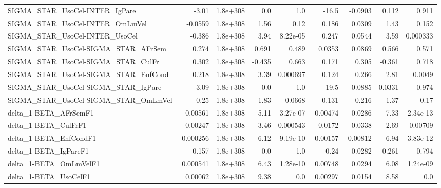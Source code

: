 \begin{tabular}{lrrrrrrrr}
SIGMA\_STAR\_UsoCel-INTER\_IgPare        &       -3.01 &     1.8e+308 &     0.0 &      1.0 &      -16.5 &     -0.0903 &        0.112 &         0.911 \\
SIGMA\_STAR\_UsoCel-INTER\_OmLmVel       &     -0.0559 &     1.8e+308 &    1.56 &     0.12 &      0.186 &      0.0309 &         1.43 &         0.152 \\
SIGMA\_STAR\_UsoCel-INTER\_UsoCel        &      -0.386 &     1.8e+308 &    3.94 & 8.22e-05 &      0.247 &      0.0544 &         3.59 &      0.000333 \\
SIGMA\_STAR\_UsoCel-SIGMA\_STAR\_AFrSem   &       0.274 &     1.8e+308 &   0.691 &    0.489 &     0.0353 &      0.0869 &        0.566 &         0.571 \\
SIGMA\_STAR\_UsoCel-SIGMA\_STAR\_CulFr    &       0.302 &     1.8e+308 &  -0.435 &    0.663 &      0.171 &       0.305 &       -0.361 &         0.718 \\
SIGMA\_STAR\_UsoCel-SIGMA\_STAR\_EnfCond  &       0.218 &     1.8e+308 &    3.39 & 0.000697 &      0.124 &       0.266 &         2.81 &        0.0049 \\
SIGMA\_STAR\_UsoCel-SIGMA\_STAR\_IgPare   &        3.09 &     1.8e+308 &     0.0 &      1.0 &       19.5 &      0.0885 &       0.0331 &         0.974 \\
SIGMA\_STAR\_UsoCel-SIGMA\_STAR\_OmLmVel  &        0.25 &     1.8e+308 &    1.83 &   0.0668 &      0.131 &       0.216 &         1.37 &          0.17 \\
delta\_1-BETA\_AFrSemF1                 &     0.00561 &     1.8e+308 &    5.11 & 3.27e-07 &    0.00474 &      0.0286 &         7.33 &      2.34e-13 \\
delta\_1-BETA\_CulFrF1                  &     0.00247 &     1.8e+308 &    3.46 & 0.000543 &    -0.0172 &     -0.0338 &         2.69 &       0.00709 \\
delta\_1-BETA\_EnfCondF1                &   -0.000256 &     1.8e+308 &    6.12 & 9.19e-10 &   -0.00157 &    -0.00812 &         6.94 &      3.83e-12 \\
delta\_1-BETA\_IgPareF1                 &      -0.157 &     1.8e+308 &     0.0 &      1.0 &      -0.24 &     -0.0282 &        0.261 &         0.794 \\
delta\_1-BETA\_OmLmVelF1                &    0.000541 &     1.8e+308 &    6.43 & 1.28e-10 &    0.00748 &      0.0294 &         6.08 &      1.24e-09 \\
delta\_1-BETA\_UsoCelF1                 &     0.00062 &     1.8e+308 &    9.38 &      0.0 &    0.00297 &      0.0154 &         8.58 &           0.0 \\

\end{tabular}

